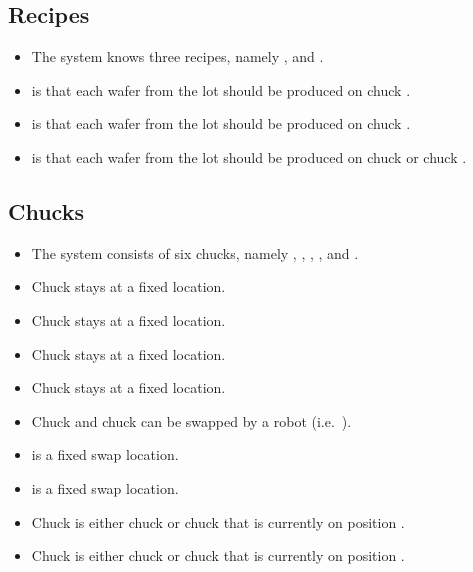 \subsection{Recipes}
\begin{itemize}
    \item The system knows three recipes, namely \recipeOne, \recipeTwo and \recipeThree.
    \item \recipeOne is that each wafer from the lot should be produced on chuck \chuckA.
    \item \recipeTwo is that each wafer from the lot should be produced on chuck \chuckB.
    \item \recipeThree is that each wafer from the lot should be produced on chuck \chuckA or chuck \chuckB.
\end{itemize}

\subsection{Chucks}
\begin{itemize}
    \item The system consists of six chucks, namely \chuckIn, \chuckOut, \chuckEmptyOne, \chuckEmptyTwo, \chuckA and \chuckB.
    \item Chuck \chuckIn stays at a fixed location.
    \item Chuck \chuckOut stays at a fixed location.
    \item Chuck \chuckEmptyOne stays at a fixed location.
    \item Chuck \chuckEmptyTwo stays at a fixed location.
    \item Chuck \chuckA and chuck \chuckB can be swapped by a robot (i.e.\ \robotSwap).
    \item \chuckMeas is a fixed swap location.
    \item \chuckProj is a fixed swap location.
    \item Chuck \chuckMeas is either chuck \chuckA or chuck \chuckB that is currently on position \chuckMeas.
    \item Chuck \chuckProj is either chuck \chuckA or chuck \chuckB that is currently on position \chuckProj. 
\end{itemize}

